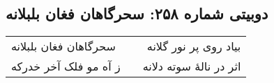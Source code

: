 \begin{center}
\section*{دوبیتی شماره ۲۵۸: سحرگاهان فغان بلبلانه}
\label{sec:258}
\begin{longtable}{l p{0.5cm} r}
سحرگاهان فغان بلبلانه
&&
بیاد روی پر نور گلانه
\\
ز آه مو فلک آخر خدرکه
&&
اثر در نالهٔ سوته دلانه
\\
\end{longtable}
\end{center}
